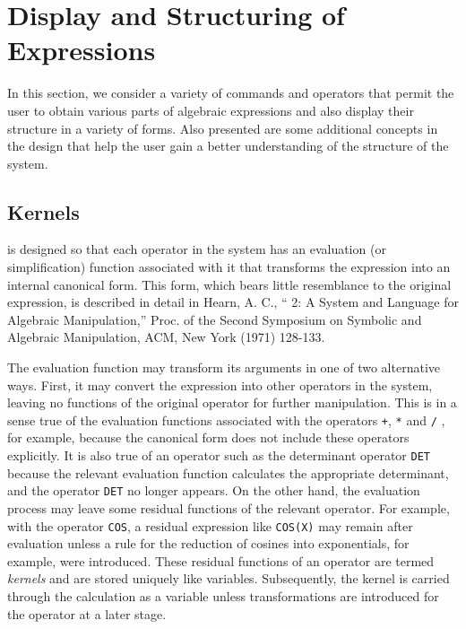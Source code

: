 \chapter{Display and Structuring of Expressions}
In this section, we consider a variety of commands and operators that
permit the user to obtain various parts of algebraic expressions and also
display their structure in a variety of forms. Also presented are some
additional concepts in the {\REDUCE} design that help the user gain a better
understanding of the structure of the system.

\section{Kernels}
{\REDUCE} is designed so that each operator in the system has an
evaluation (or simplification) function associated
with it that transforms the expression into an internal canonical form.
  This form, which bears little resemblance to the
original expression, is described in detail in Hearn, A. C., ``{\REDUCE} 2:
A System and Language for Algebraic Manipulation,'' Proc. of the Second
Symposium on Symbolic and Algebraic Manipulation, ACM, New York (1971)
128-133.

The evaluation function may transform its arguments in one of two
alternative ways.  First, it may convert the expression into other
operators in the system, leaving no functions of the original operator for
further manipulation.  This is in a sense true of the evaluation functions
associated with the operators \texttt{+}, \texttt{*} and \texttt{/} , for example,
because the canonical form does not include these
operators explicitly.  It is also true of an operator such as the
determinant operator \texttt{DET} because the relevant
evaluation function calculates the appropriate determinant, and the
operator \texttt{DET} no longer appears.  On the other hand, the evaluation
process may leave some residual functions of the relevant operator.  For
example, with the operator \texttt{COS}, a residual expression like 
\texttt{COS(X)} may remain after evaluation unless a rule for the reduction of
cosines into exponentials, for example, were introduced.  These residual
functions of an operator are termed \emph{kernels} and are
stored uniquely like variables.  Subsequently, the kernel is carried
through the calculation as a variable unless transformations are
introduced for the operator at a later stage.

